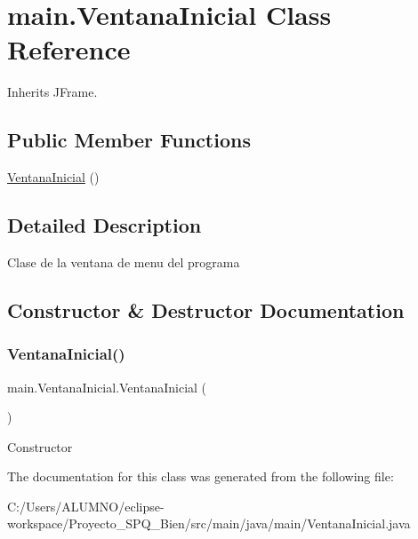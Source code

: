 \hypertarget{classmain_1_1_ventana_inicial}{}\section{main.\+Ventana\+Inicial Class Reference}
\label{classmain_1_1_ventana_inicial}


Inherits J\+Frame.

\subsection*{Public Member Functions}
\begin{DoxyCompactItemize}
\item 
\hyperlink{classmain_1_1_ventana_inicial_ab44da3835755edecc3bc5d91b4589364}{Ventana\+Inicial} ()
\end{DoxyCompactItemize}


\subsection{Detailed Description}
Clase de la ventana de menu del programa 

\subsection{Constructor \& Destructor Documentation}
\mbox{\label{classmain_1_1_ventana_inicial_ab44da3835755edecc3bc5d91b4589364}} 
\subsubsection{\texorpdfstring{Ventana\+Inicial()}{VentanaInicial()}}
{\footnotesize\ttfamily main.\+Ventana\+Inicial.\+Ventana\+Inicial (\begin{DoxyParamCaption}{ }\end{DoxyParamCaption})}

Constructor 

The documentation for this class was generated from the following file\+:\begin{DoxyCompactItemize}
\item 
C\+:/\+Users/\+A\+L\+U\+M\+N\+O/eclipse-\/workspace/\+Proyecto\+\_\+\+S\+P\+Q\+\_\+Bien/src/main/java/main/Ventana\+Inicial.\+java\end{DoxyCompactItemize}
